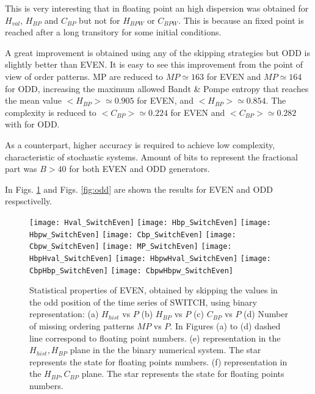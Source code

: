This is very interesting that in floating point an high dispersion was obtained for $H_{val}$, $H_{BP}$ and $C_{BP}$ but not for $H_{BPW}$ or $C_{BPW}$.
This is because an fixed point is reached after a long transitory for some initial conditions.

A great improvement is obtained using any of the skipping strategies but ODD is slightly better than EVEN.
It is easy to see this improvement from the point of view of order patterns.
MP are reduced to $MP\simeq 163$ for EVEN and $MP\simeq 164$ for ODD, increasing the maximum allowed Bandt \& Pompe entropy that reaches the mean value $<H_{BP}>\simeq 0.905$ for EVEN, and $<H_{BP}>\simeq 0.854$.
The complexity is reduced to $<C_{BP}>\simeq 0.224$ for EVEN and  $<C_{BP}>\simeq 0.282$ with for ODD.

As a counterpart, higher accuracy is required to achieve low complexity, characteristic of stochastic systems.
Amount of bits to represent the fractional part was $B>40$ for both EVEN and ODD generators.

In Figs. \ref{fig:even} and Figs. \ref{fig:odd} are shown the results for EVEN and ODD respsctivelly.

\begin{figure}
	\texttt{[image: Hval\_SwitchEven]}
	\texttt{[image: Hbp\_SwitchEven]}
	\texttt{[image: Hbpw\_SwitchEven]}
	\texttt{[image: Cbp\_SwitchEven]}
	\texttt{[image: Cbpw\_SwitchEven]}
	\texttt{[image: MP\_SwitchEven]}
	\texttt{[image: HbpHval\_SwitchEven]}
	\texttt{[image: HbpwHval\_SwitchEven]}
	\texttt{[image: CbpHbp\_SwitchEven]}
	\texttt{[image: CbpwHbpw\_SwitchEven]}
	\caption{Statistical properties of EVEN, obtained by skipping the values in the odd position of the time series of  SWITCH,  using binary representation: (a) $H_{hist}$ vs $P$ (b) $H_{BP}$ vs $P$ (c) $C_{BP}$ vs $P$ (d) Number of missing ordering patterns $MP$ vs $P$. In Figures (a) to (d) dashed line correspond to floating point numbers. (e) representation in the $H_{hist},H_{BP}$ plane in the the binary numerical system.  The star represents the state for floating points numbers. (f) representation in the $H_{BP},C_{BP}$ plane.  The star represents the state for floating points numbers.  } \label{fig:even}
\end{figure}



